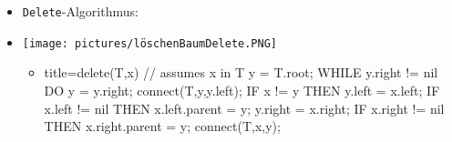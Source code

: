 \documentclass[
    12pt,
    a4paper,
    ngerman,
    color=3b,%
    marginpar=false,
    colorback=false,
    leqno,
]{tudaexercise}
\begin{document}
\begin{itemize}
\begin{itemize}
\begin{itemize}
                        \item \texttt{Delete}-Algorithmus:
                        \item[]
                              \begin{minipage}{0.4\textwidth}
                                  \texttt{[image: pictures/löschenBaumDelete.PNG]}
                              \end{minipage}
                              \begin{minipage}{0.45\textwidth}
                                  \begin{itemize}
                                      \item[]
                                            \begin{ccode}[autogobble]{title={delete(T,x) // assumes x in T}}
                                                y = T.root;
                                                WHILE y.right != nil DO
                                                    y = y.right;
                                                connect(T,y,y.left);
                                                IF x != y THEN
                                                    y.left = x.left;
                                                    IF x.left != nil THEN
                                                        x.left.parent = y;
                                                    y.right = x.right;
                                                    IF x.right != nil THEN
                                                        x.right.parent = y;
                                                    connect(T,x,y);
                                            \end{ccode}
                                  \end{itemize}
                              \end{minipage}
                    \end{itemize}
          \end{itemize}
\end{itemize}

\pagebreak
\end{document}

